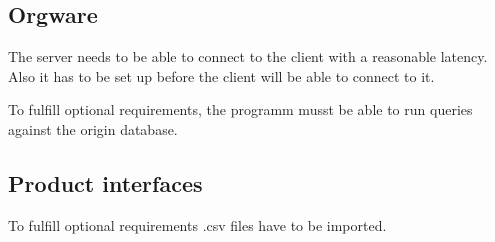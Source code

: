 \subsection{Orgware}

The server needs to be able to connect to the client with a reasonable latency.
Also it has to be set up before the client will be able to connect to it.


To fulfill optional requirements, the programm musst be able to run queries against
the origin database. 

\subsection{Product interfaces}

To fulfill optional requirements .csv files have to be imported.
